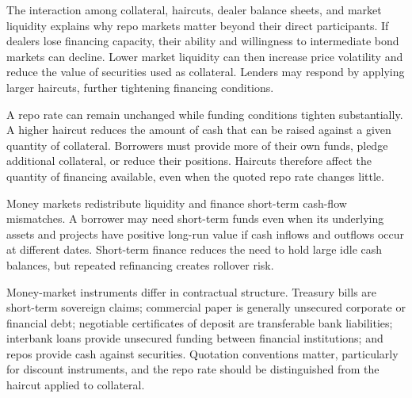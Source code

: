 The interaction among collateral, haircuts, dealer
balance sheets, and market liquidity explains why
repo markets matter beyond their direct participants.
If dealers lose financing capacity, their ability
and willingness to intermediate bond markets can
decline. Lower market liquidity can then increase
price volatility and reduce the value of securities
used as collateral. Lenders may respond by applying
larger haircuts, further tightening financing
conditions.
\begin{tcolorbox}[
  enhanced,
  breakable,
  colback=white,
  colframe=FinanceBlue,
  boxrule=0.7pt,
  sharp corners,
  borderline west={2.2pt}{0pt}{FinanceBlue},
  title=\textbf{Financial Perspective: A Higher Haircut Can Tighten Funding Without a Higher Interest Rate},
  coltitle=white,
  colbacktitle=FinanceBlue,
  fonttitle=\bfseries,
  before skip=1.2em,
  after skip=1.2em
]

A repo rate can remain unchanged while funding
conditions tighten substantially. A higher haircut
reduces the amount of cash that can be raised against
a given quantity of collateral. Borrowers must provide
more of their own funds, pledge additional collateral,
or reduce their positions. Haircuts therefore affect
the quantity of financing available, even when the
quoted repo rate changes little.

\end{tcolorbox}



Money markets redistribute liquidity and finance short-term cash-flow mismatches. A borrower may need short-term funds even when its underlying assets and projects have positive long-run value if cash inflows and outflows occur at different dates. Short-term finance reduces the need to hold large idle cash balances, but repeated refinancing creates rollover risk.

Money-market instruments differ in contractual structure. Treasury bills are short-term sovereign claims; commercial paper is generally unsecured corporate or financial debt; negotiable certificates of deposit are transferable bank liabilities; interbank loans provide unsecured funding between financial institutions; and repos provide cash against securities. Quotation conventions matter, particularly for discount instruments, and the repo rate should be distinguished from the haircut applied to collateral.

